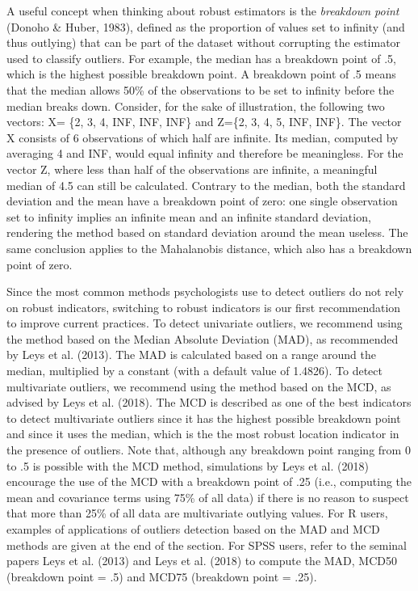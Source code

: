 \documentclass[man,floatsintext]{apa6}
\begin{document}
A useful concept when thinking about robust estimators is the \emph{breakdown point} (Donoho \& Huber, 1983), defined as the proportion of values set to infinity (and thus outlying) that can be part of the dataset without corrupting the estimator used to classify outliers. For example, the median has a breakdown point of .5, which is the highest possible breakdown point. A breakdown point of .5 means that the median allows 50\% of the observations to be set to infinity before the median breaks down. Consider, for the sake of illustration, the following two vectors: X= \{2, 3, 4, INF, INF, INF\} and Z=\{2, 3, 4, 5, INF, INF\}. The vector X consists of 6 observations of which half are infinite. Its median, computed by averaging 4 and INF, would equal infinity and therefore be meaningless. For the vector Z, where less than half of the observations are infinite, a meaningful median of 4.5 can still be calculated. Contrary to the median, both the standard deviation and the mean have a breakdown point of zero: one single observation set to infinity implies an infinite mean and an infinite standard deviation, rendering the method based on standard deviation around the mean useless. The same conclusion applies to the Mahalanobis distance, which also has a breakdown point of zero.

Since the most common methods psychologists use to detect outliers do not rely on robust indicators, switching to robust indicators is our first recommendation to improve current practices. To detect univariate outliers, we recommend using the method based on the Median Absolute Deviation (MAD), as recommended by Leys et al. (2013). The MAD is calculated based on a range around the median, multiplied by a constant (with a default value of 1.4826). To detect multivariate outliers, we recommend using the method based on the MCD, as advised by Leys et al. (2018). The MCD is described as one of the best indicators to detect multivariate outliers since it has the highest possible breakdown point and since it uses the median, which is the the most robust location indicator in the presence of outliers. Note that, although any breakdown point ranging from 0 to .5 is possible with the MCD method, simulations by Leys et al. (2018) encourage the use of the MCD with a breakdown point of .25 (i.e., computing the mean and covariance terms using 75\% of all data) if there is no reason to suspect that more than 25\% of all data are multivariate outlying values. For R users, examples of applications of outliers detection based on the MAD and MCD methods are given at the end of the section. For SPSS users, refer to the seminal papers Leys et al. (2013) and Leys et al. (2018) to compute the MAD, MCD50 (breakdown point = .5) and MCD75 (breakdown point = .25).
\end{document}
